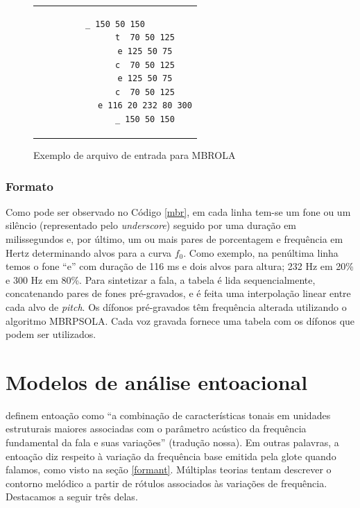 \begin{figure}[thp] %
    \centering          %
    \caption{Exemplo de arquivo de entrada para MBROLA}
    \begin{tabular}{c}  %
        \begin{lstlisting}[label=mbr]
            _ 150 50 150
            t  70 50 125
            e 125 50 75
            c  70 50 125
            e 125 50 75
            c  70 50 125
            e 116 20 232 80 300
            _ 150 50 150
        \end{lstlisting}
    \end{tabular}
\end{figure}

\subsubsection{Formato}
Como pode ser observado no Código \ref{mbr}, em cada linha tem-se um fone ou um
silêncio (representado pelo \emph{underscore}) seguido por uma duração em
milissegundos e, por último, um ou mais pares de porcentagem e frequência em
Hertz determinando alvos para a curva $ f_0 $. Como exemplo, na penúltima linha temos
o fone ``e'' com duração de 116 ms e dois alvos para altura; 232 Hz em 20\% e
300 Hz em 80\%. Para sintetizar a fala, a tabela é lida sequencialmente,
concatenando pares de fones pré-gravados, e é feita uma interpolação linear
entre cada alvo de \emph{pitch}. Os dífonos pré-gravados têm frequência alterada
utilizando o algoritmo MBRPSOLA. Cada voz gravada fornece uma tabela com os dífonos que podem ser utilizados. 

\section{Modelos de análise entoacional}
\label{entoa}

 definem entoação como ``a combinação de características
tonais em unidades estruturais maiores associadas com o parâmetro acústico da
frequência fundamental da fala e suas variações'' (tradução nossa). Em outras
palavras, a entoação diz respeito à variação da frequência base emitida pela
glote quando falamos, como visto na seção \ref{formant}. Múltiplas teorias
tentam descrever o contorno melódico a partir de rótulos associados às variações
de frequência. Destacamos a seguir três delas.

